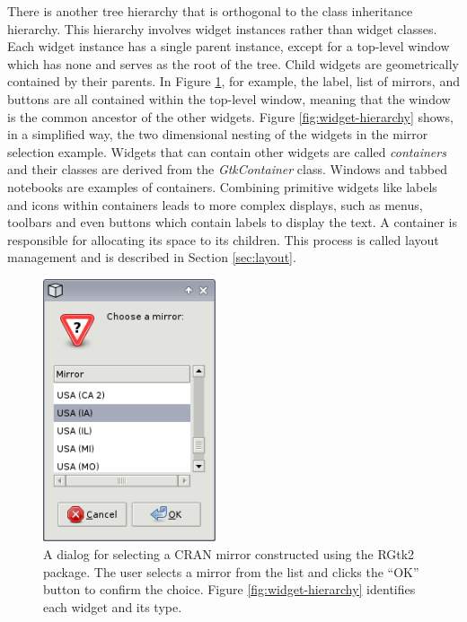\documentclass[article]{jss}
\begin{document}
There is another tree hierarchy that is orthogonal to the 
class inheritance hierarchy. This hierarchy involves widget instances rather
than widget classes. Each widget instance has a single parent instance, except
for a top-level window which has none and serves as the root of the tree. Child widgets are geometrically
contained by their parents. In Figure \ref{fig:cran-mirror}, 
for example, the label, list of mirrors, and buttons are all contained within the 
top-level window, meaning that the window is the common ancestor of the other widgets.
Figure \ref{fig:widget-hierarchy} shows, in a simplified way, the two dimensional
nesting of the widgets in the mirror selection example. Widgets that
can contain 
other widgets are called \emph{containers} and their classes are derived from 
the \emph{GtkContainer} class. Windows and tabbed notebooks are examples of containers.
Combining primitive widgets like labels and icons within containers
leads to more complex displays, such as menus, toolbars and even
buttons which contain labels to display the text. A container is 
responsible for allocating its space to its children. This process is called
layout management and is described in Section \ref{sec:layout}.

\begin{figure}[bhp]
\begin{center}
\includegraphics[width=2in]{cran-mirror.png}
\caption{\label{fig:cran-mirror}A dialog for selecting a CRAN mirror constructed
using the RGtk2 package. The user selects a mirror from the list and clicks the
``OK'' button to confirm the choice.
Figure \ref{fig:widget-hierarchy} identifies each widget and
its type.}
\end{center}
\end{figure}
\end{document}
